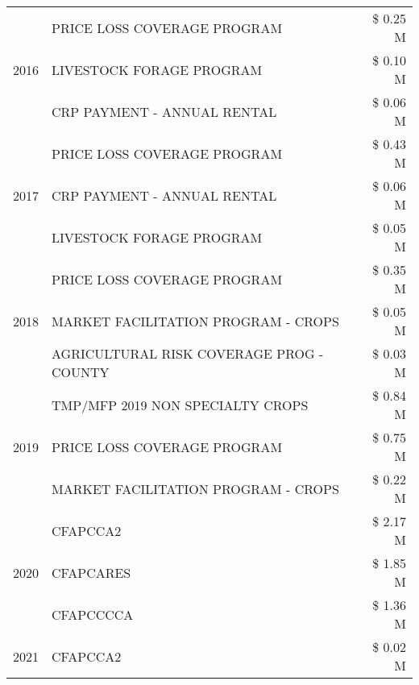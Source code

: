 \begin{tabular}{llr}
\multirow[t]{3}{*}{2016} & PRICE LOSS COVERAGE PROGRAM & \$ 0.25 M \\
 & LIVESTOCK FORAGE PROGRAM & \$ 0.10 M \\
 & CRP PAYMENT - ANNUAL RENTAL & \$ 0.06 M \\
\cline{1-3}
\multirow[t]{3}{*}{2017} & PRICE LOSS COVERAGE PROGRAM & \$ 0.43 M \\
 & CRP PAYMENT - ANNUAL RENTAL & \$ 0.06 M \\
 & LIVESTOCK FORAGE PROGRAM & \$ 0.05 M \\
\cline{1-3}
\multirow[t]{3}{*}{2018} & PRICE LOSS COVERAGE PROGRAM & \$ 0.35 M \\
 & MARKET FACILITATION PROGRAM - CROPS & \$ 0.05 M \\
 & AGRICULTURAL RISK COVERAGE PROG - COUNTY & \$ 0.03 M \\
\cline{1-3}
\multirow[t]{3}{*}{2019} & TMP/MFP 2019 NON SPECIALTY CROPS & \$ 0.84 M \\
 & PRICE LOSS COVERAGE PROGRAM & \$ 0.75 M \\
 & MARKET FACILITATION PROGRAM - CROPS & \$ 0.22 M \\
\cline{1-3}
\multirow[t]{3}{*}{2020} & CFAPCCA2 & \$ 2.17 M \\
 & CFAPCARES & \$ 1.85 M \\
 & CFAPCCCCA & \$ 1.36 M \\
\cline{1-3}
2021 & CFAPCCA2 & \$ 0.02 M \\
\cline{1-3}
\bottomrule
\end{tabular}
